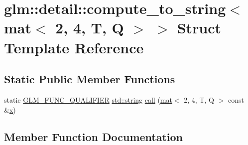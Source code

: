 \hypertarget{structglm_1_1detail_1_1compute__to__string_3_01mat_3_012_00_014_00_01_t_00_01_q_01_4_01_4}{}\section{glm\+:\+:detail\+:\+:compute\+\_\+to\+\_\+string$<$ mat$<$ 2, 4, T, Q $>$ $>$ Struct Template Reference}
\label{structglm_1_1detail_1_1compute__to__string_3_01mat_3_012_00_014_00_01_t_00_01_q_01_4_01_4}
\subsection*{Static Public Member Functions}
\begin{DoxyCompactItemize}
\item 
static \mbox{\hyperlink{setup_8hpp_a33fdea6f91c5f834105f7415e2a64407}{G\+L\+M\+\_\+\+F\+U\+N\+C\+\_\+\+Q\+U\+A\+L\+I\+F\+I\+ER}} \mbox{\hyperlink{_s_d_l__opengl__glext_8h_ae84541b4f3d8e1ea24ec0f466a8c568b}{std\+::string}} \mbox{\hyperlink{structglm_1_1detail_1_1compute__to__string_3_01mat_3_012_00_014_00_01_t_00_01_q_01_4_01_4_a33aa32e523377e9a404a6eb7b4048e76}{call}} (\mbox{\hyperlink{structglm_1_1mat}{mat}}$<$ 2, 4, T, Q $>$ const \&\mbox{\hyperlink{_s_d_l__opengl_8h_ad0e63d0edcdbd3d79554076bf309fd47}{x}})
\end{DoxyCompactItemize}


\subsection{Member Function Documentation}
\mbox{\label{structglm_1_1detail_1_1compute__to__string_3_01mat_3_012_00_014_00_01_t_00_01_q_01_4_01_4_a33aa32e523377e9a404a6eb7b4048e76}} 
